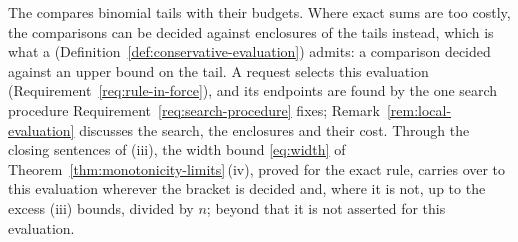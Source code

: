 
The  compares binomial tails
with their budgets. Where exact sums are too costly, the comparisons can be
decided against enclosures of the tails instead, which is what a
 (Definition~\ref{def:conservative-evaluation})
admits: a comparison decided against an upper bound on the tail. A request selects this evaluation
(Requirement~\ref{req:rule-in-force}), and its endpoints are found by the one
search procedure Requirement~\ref{req:search-procedure} fixes;
Remark~\ref{rem:local-evaluation} discusses the search, the enclosures and
their cost. Through the closing sentences of (iii), the width bound
\eqref{eq:width} of Theorem~\ref{thm:monotonicity-limits}\,(iv), proved for
the exact rule, carries over to this evaluation wherever the bracket is
decided and, where it is not, up to the excess (iii) bounds, divided by $n$;
beyond that it is not asserted for this evaluation.

